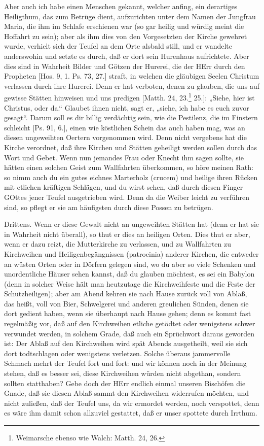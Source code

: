 Aber auch ich habe einen Menschen gekannt, welcher anfing, ein derartiges Heiligthum, das zum Betrüge dient, aufzurichten unter dem Namen der Jungfrau Maria, die ihm im Schlafe erschienen war (so gar heilig und würdig meint die Hoffahrt zu sein); aber als ihm dies von den Vorgesetzten der Kirche gewehret wurde, verhielt
sich der Teufel an dem Orte alsbald still, und er wandelte anderswohin und setzte es durch, daß er dort sein Hurenhaus aufrichtete. Aber dies sind in Wahrheit Bilder und Götzen der Hurerei, die der HErr durch den Propheten [Hos. 9, 1. Ps. 73, 27.] straft, in welchen die gläubigen Seelen Christum verlassen durch ihre Hurerei. Denn er hat verboten, denen zu glauben, die uns auf gewisse Stätten hinweisen und uns predigen [Matth. 24, 23.\footnote{Weimarsche ebenso wie Walch: Matth. 24, 26.} 25.]: „Siehe, hier ist Christus, oder da.“ Glaubet ihnen nicht, sagt er, „siehe, ich habe es euch zuvor gesagt“. Darum soll es dir billig verdächtig sein, wie die Pestilenz, die im Finstern schleicht [Ps. 91, 6.], einen wie köstlichen Schein das auch haben mag, was an diesen ungeweihten Oertern vorgenommen wird. Denn nicht vergebens hat die Kirche verordnet, daß ihre Kirchen und Stätten geheiligt werden sollen durch das Wort und Gebet. Wenn nun jemandes Frau oder Knecht ihm sagen sollte, sie hätten einen solchen Geist zum Wallfahrten überkommen, so höre meinen Rath: so nimm auch du ein gutes eichnes Marterholz (crucem) und heilige ihren Rücken mit etlichen kräftigen Schlägen, und du wirst sehen, daß durch diesen Finger GOttes jener Teufel ausgetrieben wird. Denn da die Weiber leicht zu verführen sind, so pflegt er sie am häufigsten durch diese Possen zu betrügen.

Drittens. Wenn er diese Gewalt nicht an ungeweihten Stätten hat (denn er hat sie in Wahrheit nicht überall), so thut er dies an heiligen Orten. Dies thut er aber, wenn er dazu reizt, die Mutterkirche zu verlassen, und zu Wallfahrten zu Kirchweihen und Heiligenbegängnissen (patrocinia) anderer Kirchen, die entweder an wüsten Orten oder in Dörfern gelegen sind, wo du aber so viele Schenken und unordentliche Häuser sehen kannst, daß du glauben möchtest, es sei ein Babylon (denn in solcher Weise hält man heutzutage die Kirchweihfeste und die Feste der Schutzheiligen); aber am Abend kehren sie nach Hause zurück voll von Ablaß, das heißt, voll von Bier, Schwelgerei und anderen greulichen Sünden, denen sie dort gedient haben, wenn sie überhaupt nach Hause gehen; denn es kommt fast regelmäßig vor, daß auf den Kirchweihen etliche getödtet oder wenigstens schwer verwundet werden, in solchem Grade, daß auch ein Sprüchwort daraus geworden ist: Der Ablaß auf den Kirchweihen wird spät Abends ausgetheilt, weil sie sich dort todtschlagen oder wenigstens verletzen. Solche überaus jammervolle Schmach mehrt der Teufel fort und fort: und wir können noch in der Meinung stehen, daß es besser sei, diese Kirchweihen würden nicht abgethan, sondern sollten statthaben? Gebe doch der HErr endlich einmal unseren Bischöfen die Gnade, daß sie diesen Ablaß sammt den Kirchweihen widerrufen möchten, und nicht zuließen, daß der Teufel uns, da wir ermordet werden, noch verspottet, denn es wäre ihm damit schon allzuviel gestattet, daß er unser spottete durch Irrthum.

